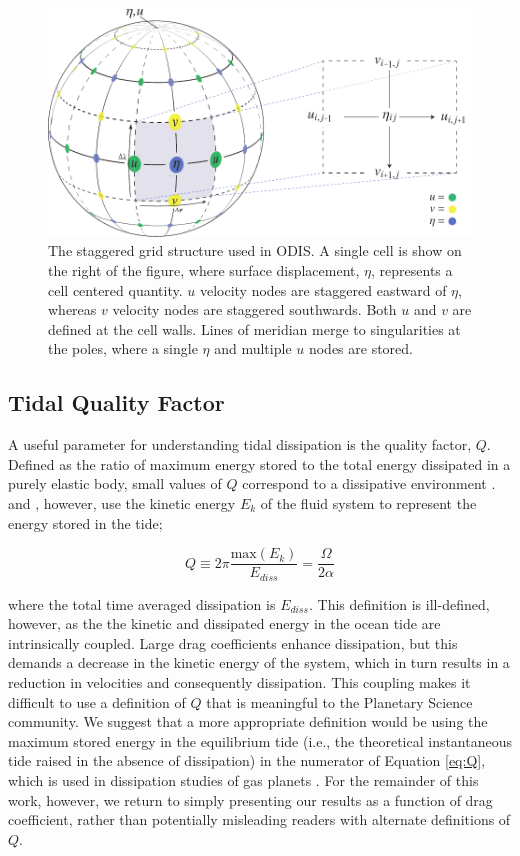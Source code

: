 \begin{figure}[t]
\centering
\includegraphics[width=0.8\linewidth]{Figures/GridDiagram_revision}
\caption{The staggered grid structure used in ODIS. A single cell is show on the right of the figure, where surface displacement, $\eta$, represents a cell centered quantity. $u$ velocity nodes are staggered eastward of $\eta$, whereas $v$ velocity nodes are staggered southwards. Both $u$ and $v$ are defined at the cell walls. Lines of meridian merge to singularities at the poles, where a single $\eta$ and multiple $u$ nodes are stored.\label{fig:grid}}
\end{figure}

\subsection{Tidal Quality Factor}

A useful parameter for understanding tidal dissipation is the quality factor, $Q$. Defined as the ratio of maximum energy stored to the total energy dissipated in a purely elastic body, small values of $Q$ correspond to a dissipative environment \citep{goldreich1966q}. \citet{tyler2011tidal} and \citet{matsuyama2014tidal}, however, use the kinetic energy $E_k$ of the fluid system to represent the energy stored in the tide;

\begin{equation}\label{eq:Q}
Q \equiv 2 \pi \dfrac{\text{max} \left( E_{k} \right)}{E_{diss}} = \dfrac{\Omega}{2 \alpha}
\end{equation}

where the total time averaged dissipation is $E_{diss}$. This definition is ill-defined, however, as the the kinetic and dissipated energy in the ocean tide are intrinsically coupled. Large drag coefficients enhance dissipation, but this demands a decrease in the kinetic energy of the system, which in turn results in a reduction in velocities and consequently dissipation. This coupling makes it difficult to use a definition of $Q$ that is meaningful to the Planetary Science community. We suggest that a more appropriate definition would be using the maximum stored energy in the equilibrium tide (i.e., the theoretical instantaneous tide raised in the absence of dissipation) in the numerator of Equation \ref{eq:Q}, which is used in dissipation studies of gas planets \citep{goldreich1966q}. For the remainder of this work, however, we return to simply presenting our results as a function of drag coefficient, rather than potentially misleading readers with alternate definitions of $Q$. 

